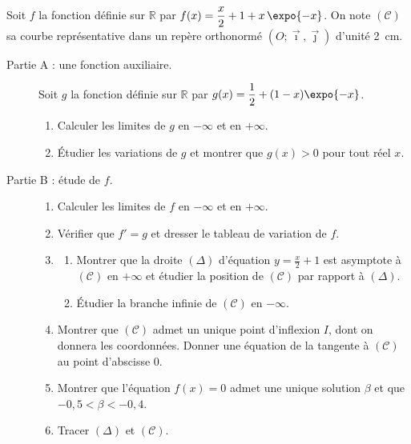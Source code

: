 \begin{exo}
\label{exo:pb x e moins x}
      Soit $f$ la fonction d\'efinie sur $\mathbb{R}$ par $f(x) = \dfrac{x}{2} + 1 + x\,\expo{-x}$.
      On note $(\mathscr{C})$ sa courbe repr\'esentative dans un rep\`ere orthonorm\'e $(O ; \vec{\imath} , \vec{\jmath})$
      d'unit\'e 2~cm.
      \begin{description}
            \item[Partie A : une fonction auxiliaire.]
                  Soit $g$ la fonction d\'efinie sur $\mathbb{R}$ par $g(x) = \dfrac{1}{2} + (1 - x)\expo{-x}$.
                  \begin{enumerate}
                        \item Calculer les limites de $g$ en $-\infty$ et en $+\infty$.
                        \item \'Etudier les variations de $g$ et montrer que $g(x) > 0$ pour tout r\'eel $x$.
                  \end{enumerate}
            \item[Partie B : \'etude de $f$.]
                  \begin{enumerate}
                        \item Calculer les limites de $f$ en $-\infty$ et en $+\infty$.
                        \item V\'erifier que $f' = g$ et dresser le tableau de variation de $f$.
                        \item \begin{enumerate}
                                    \item Montrer que la droite $(\Delta)$ d'\'equation $y = \frac{x}{2} + 1$ est asymptote \`a
                                          $(\mathscr{C})$ en $+\infty$ et \'etudier la position de $(\mathscr{C})$ par rapport \`a $(\Delta)$.
                                    \item \'Etudier la branche infinie de $(\mathscr{C})$ en $-\infty$.
                              \end{enumerate}
                        \item Montrer que $(\mathscr{C})$ admet un unique point d'inflexion $I$, dont on donnera les coordonn\'ees.
                              Donner une \'equation de la tangente \`a $(\mathscr{C})$ au point d'abscisse $0$.
                        \item Montrer que l'\'equation $f(x) = 0$ admet une unique solution $\beta$ et que $-0{,}5 < \beta < -0{,}4$.
                        \item Tracer $(\Delta)$ et $(\mathscr{C})$.

\end{enumerate}
\end{description}
\end{exo}
